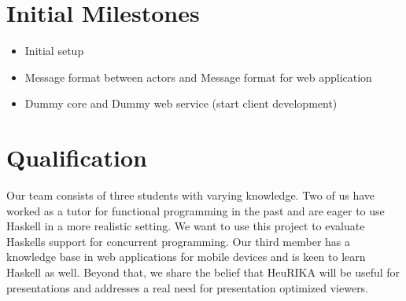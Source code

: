 \documentclass[a4paper,11pt,notitlepage]{scrreprt}
\begin{document}
\section{Initial Milestones}
\begin{itemize}
	\item Initial setup
	\item Message format between actors and Message format for web application
	\item Dummy core and Dummy web service (start client development)
\end{itemize}

\section{Qualification}
Our team consists of three students with varying knowledge. Two of us have worked as a tutor for functional programming in the past and are eager to use Haskell in a more realistic setting. We want to use this project to evaluate Haskells support for concurrent programming. Our third member has a knowledge base in web applications for mobile devices and is keen to learn Haskell as well. Beyond that, we share the belief that HeuRIKA will be useful for presentations and addresses a real need for presentation optimized viewers.
\end{document}
